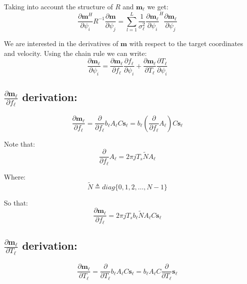 \documentclass[10pt,a4paper]{report}
\begin{document}
Taking into account the structure of $R$ and $\mathbf{m_\ell}$ we get:
\begin{equation}
\frac{\partial \mathbf{m}^H}{\partial \psi_{i}}R^{-1}\frac{\partial \mathbf{m}}{\partial \psi_{j}} = 
\sum_{l=1}^L\frac{1}{\sigma_\ell^2}\frac{\partial \mathbf{m_\ell}}{\partial \psi_i}^H\frac{\partial \mathbf{m_\ell}}{\partial \psi_j}
\end{equation}

We are interested in the derivatives of $\mathbf{m}$ with respect to the target coordinates and velocity. Using the chain rule we can write:
\begin{equation}
\frac{\partial \mathbf{m_\ell}}{\partial \psi_i}=\frac{\partial \mathbf{m_\ell}}{\partial f_\ell}\frac{\partial f_\ell}{\partial \psi_i}+\frac{\partial \mathbf{m_\ell}}{\partial T_\ell}  \frac{\partial T_\ell}{\partial \psi_i}                                                                  
\end{equation}

\subsection{$\frac{\partial \mathbf{m_\ell}}{\partial f_\ell}$ derivation:}
\begin{equation}
\frac{\partial \mathbf{m_\ell}}{\partial f_\ell}=\frac{\partial}{\partial f_\ell} b_\ell A_\ell C \mathbf{s_\ell} = b_\ell ( \frac{\partial}{\partial f_\ell} A_\ell ) C \mathbf{s_\ell}
\end{equation}

Note that:
\begin{equation}
\frac{\partial}{\partial f_\ell}A_\ell = 2 \pi j T_s \tilde{N} A_\ell
\end{equation}

Where:
\begin{equation}
\tilde{N} \triangleq diag\{0,1,2,\dots,N-1\}
\end{equation}

So that:
\begin{equation}
\frac{\partial \mathbf{m_\ell}}{\partial f_\ell}=2 \pi j T_s b_\ell \tilde{N} A_\ell C \mathbf{s_\ell}
\end{equation}

\subsection{$\frac{\partial \mathbf{m_\ell}}{\partial T_\ell}$ derivation:}
\begin{equation}
\frac{\partial \mathbf{m_\ell}}{\partial T_\ell} =\frac{\partial}{\partial T_\ell} b_\ell  A_\ell C \mathbf{s_\ell}=b_\ell  A_\ell C \frac{\partial}{\partial T_\ell}\mathbf{s_\ell}
\end{equation}
\end{document}
